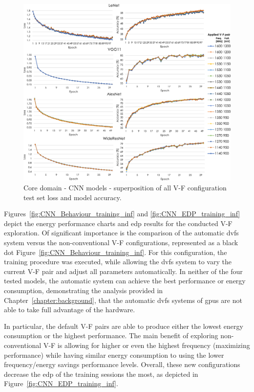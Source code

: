 \begin{figure}[htb]
    \centering
        \includegraphics[width=\textwidth]{Figures/Application To Deep Learning/CNN_loss_acc.pdf}
        \caption{Core domain - CNN models - superposition of all V-F configuration test set loss and model accuracy.}
    \label{fig:CNN_loss}
\end{figure}

Figures~\ref{fig:CNN_Behaviour_training_inf} and \ref{fig:CNN_EDP_training_inf} depict the energy performance charts and \acrshort{edp} results for the conducted V-F exploration. Of significant importance is the comparison of the automatic \acrshort{dvfs} system versus the non-conventional V-F configurations, represented as a black dot Figure~\ref{fig:CNN_Behaviour_training_inf}. For this configuration, the training procedure was executed, while allowing the \acrshort{dvfs} system to vary the current V-F pair and adjust all parameters automatically. In neither of the four tested models, the automatic system can achieve the best performance or energy consumption, demonstrating the analysis provided in Chapter~\ref{chapter:background}, that the automatic \acrshort{dvfs} systems of \acrshort{gpu}s are not able to take full advantage of the hardware. 

In particular, the default V-F pairs are able to produce either the lowest energy consumption or the highest performance. 
The main benefit of exploring non-conventional V-F is allowing for higher or even the highest frequency (maximizing performance) while having similar energy consumption to using the lower frequency/energy savings performance levels.
Overall, these new configurations decrease the \acrshort{edp} of the training sessions the most, as depicted in Figure~\ref{fig:CNN_EDP_training_inf}.



